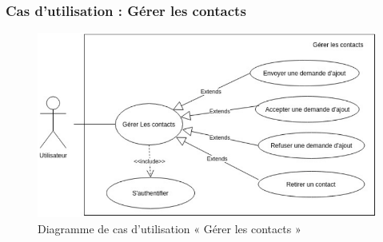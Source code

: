 \documentclass[11pt,a4paper,oneside]{book}
\begin{document}
		\subsubsection{Cas d’utilisation : Gérer les contacts }
		
		\begin{figure}[H]
			\centering
			\includegraphics[width=1\textwidth]{Diagrammes/gerer_contact}
			\caption{Diagramme de cas d’utilisation « Gérer les contacts »}
			\label{fig:gerercontact}
		\end{figure}
		
\end{document}
